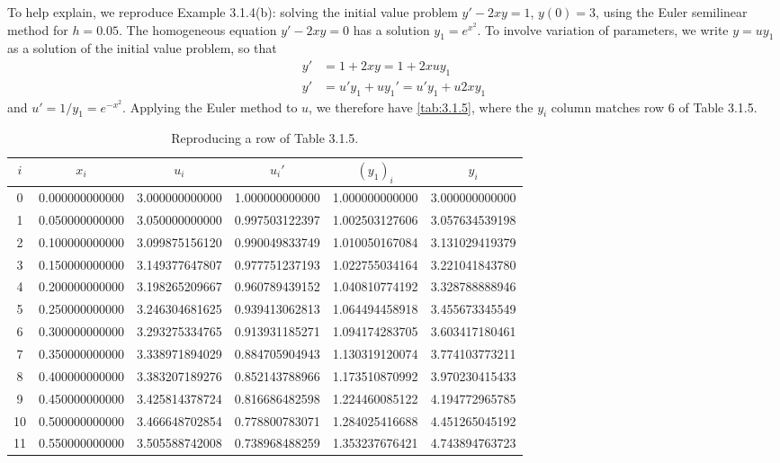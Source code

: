 \documentclass{article}
\begin{document}
To help explain, we reproduce Example 3.1.4(b): solving the initial value problem $y'-2xy=1$, $y(0)=3$, using the Euler semilinear method for $h=0.05$.
The homogeneous equation $y'-2xy=0$ has a solution $y_1=e^{x^2}$.
To involve variation of parameters, we write $y=uy_1$ as a solution of the initial value problem, so that
\begin{align*}
y'&=1+2xy=1+2xuy_1 \\
y'&=u'y_1+uy_1'=u'y_1+u2xy_1
\end{align*}
and $u'=1/y_1=e^{-x^2}$.
Applying the Euler  method to $u$, we therefore have \autoref{tab:3.1.5}, where the $y_i$ column matches row 6 of Table 3.1.5.
\begin{table}\centering
\caption{Reproducing a row of Table 3.1.5.}\label{tab:3.1.5}
\begin{tabular}{S[table-format=2] S[table-format=1.2] S[table-format=1.9]
S[table-format=1.9] S[table-format=2.8] S[table-format=3.7]}\toprule
{$i$} & {$x_i$} & {$u_i$} & {$u_i'$} & {$(y_1)_i$} & {$y_i$} \\\midrule
0 & 0.000000000000 & 3.000000000000 & 1.000000000000 & 1.000000000000 & 3.000000000000 \\
1 & 0.050000000000 & 3.050000000000 & 0.997503122397 & 1.002503127606 & 3.057634539198 \\
2 & 0.100000000000 & 3.099875156120 & 0.990049833749 & 1.010050167084 & 3.131029419379 \\
3 & 0.150000000000 & 3.149377647807 & 0.977751237193 & 1.022755034164 & 3.221041843780 \\
4 & 0.200000000000 & 3.198265209667 & 0.960789439152 & 1.040810774192 & 3.328788888946 \\
5 & 0.250000000000 & 3.246304681625 & 0.939413062813 & 1.064494458918 & 3.455673345549 \\
6 & 0.300000000000 & 3.293275334765 & 0.913931185271 & 1.094174283705 & 3.603417180461 \\
7 & 0.350000000000 & 3.338971894029 & 0.884705904943 & 1.130319120074 & 3.774103773211 \\
8 & 0.400000000000 & 3.383207189276 & 0.852143788966 & 1.173510870992 & 3.970230415433 \\
9 & 0.450000000000 & 3.425814378724 & 0.816686482598 & 1.224460085122 & 4.194772965785 \\
10 & 0.500000000000 & 3.466648702854 & 0.778800783071 & 1.284025416688 & 4.451265045192 \\
11 & 0.550000000000 & 3.505588742008 & 0.738968488259 & 1.353237676421 & 4.743894763723 \\

\end{tabular}
\end{table}
\end{document}
